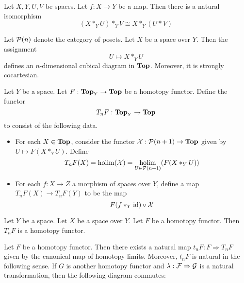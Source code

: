 \documentclass[a4paper]{article}
\begin{document}
\begin{lmm}{}{} Let $X,Y,U,V$ be spaces. Let $f:X\to Y$ be a map. Then there is a natural isomorphism $$(X\ast_YU)\ast_YV\cong X\ast_Y(U\ast V)$$
\end{lmm}

\begin{prp}{}{} Let $\mathcal{P}(n)$ denote the category of posets. Let $X$ be a space over $Y$. Then the assignment $$U\mapsto X\ast_YU$$ defines an $n$-dimensional cubical diagram in $\bold{Top}$. Moreover, it is strongly cocartesian. 
\end{prp}

\begin{defn}{}{} Let $Y$ be a space. Let $F:\bold{Top}_Y\to\bold{Top}$ be a homotopy functor. Define the functor $$T_nF:\bold{Top}_Y\to\bold{Top}$$ to consist of the following data. 
\begin{itemize}
\item For each $X\in\bold{Top}$, consider the functor $\mathcal{X}:\mathcal{P}(n+1)\to\bold{Top}$ given by $U\mapsto F(X\ast_YU)$. Define $$T_nF(X)=\operatorname*{holim}(\mathcal{X})=\operatorname*{holim}_{U\in\mathcal{P}(n+1)}(F(X\ast_YU))$$
\item For each $f:X\to Z$ a morphism of spaces over $Y$, define a map $T_nF(X)\to T_nF(Y)$ to be the map $$F(f\ast_Y\text{id})\circ\mathcal{X}$$
\end{itemize}
\end{defn}

\begin{lmm}{}{} Let $Y$ be a space. Let $X$ be a space over $Y$. Let $F$ be a homotopy functor. Then $T_nF$ is a homotopy functor.   
\end{lmm}

\begin{prp}{}{} Let $F$ be a homotopy functor. Then there exists a natural map $t_nF:F\Rightarrow T_nF$ given by the canonical map of homotopy limits. Moreover, $t_nF$ is natural in the following sense. If $G$ is another homotopy functor and $\lambda:\mathcal{F}\Rightarrow\mathcal{G}$ is a natural transformation, then the following diagram commutes: \\~\\
\\~\\
\end{prp}
\end{document}
